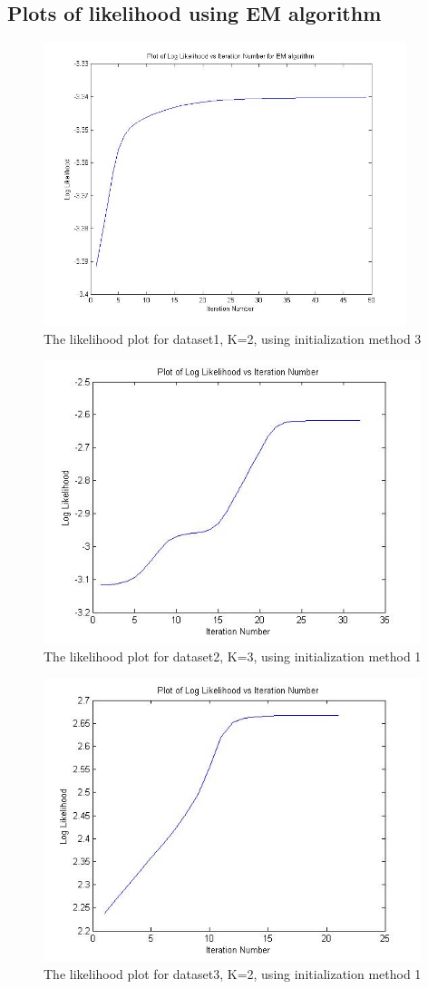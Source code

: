 \documentclass[11pt,psfig]{article}
\begin{document}
\subsection*{Plots of likelihood using EM algorithm}

\begin{figure}[H]
\centering
\includegraphics[height=3.25in]{dataset1_EMlogLikelihoodPlot.jpg}
\caption{The likelihood plot for dataset1, K=2, using initialization method 3}
\end{figure}

\begin{figure}[H]
\centering
\includegraphics[height=3.25in]{dataset2_EMlogLikelihoodPlot.jpg}
\caption{The likelihood plot for dataset2, K=3, using initialization method 1}
\end{figure}

\begin{figure}[H]
\centering
\includegraphics[height=3.25in]{dataset3_EMlogLikelihoodPlot.jpg}
\caption{The likelihood plot for dataset3, K=2, using initialization method 1}
\end{figure}
\end{document}

